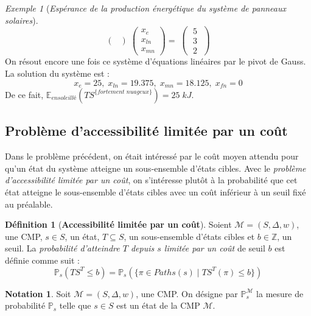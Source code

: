 \documentclass[12pt,a4paper]{report}
\theoremstyle{definition}%
\newtheorem{definition}{Définition}[chapter]
\newtheorem*{notation}{Notation}
\theoremstyle{remark}
\newtheorem{example}{Exemple}[chapter]
\newcommand{\pr}{\mathbb{P}}
\begin{document}
\begin{example}[\textit{Espérance de la production énergétique du système de panneaux solaires}]
\[\begin{pmatrix}
\end{pmatrix}
\;
\begin{pmatrix}
x_{e} \\[0.3em] x _{ln} \\[0.3em] x_{mn}
\end{pmatrix}
= \;
\begin{pmatrix}
\;5 \; \\[0.3em] \; 3 \; \\[0.3em] \; 2 \;
\end{pmatrix}
\]
On résout encore une fois ce système d'équations linéaires par le pivot de Gauss. La solution du système est :
\[ x_e = 25, \; x_{ln} = 19.375, \; x_{mn} = 18.125, \; x_{fn} = 0  \]
De ce fait, $\mathbb{E}_{\textit{ensoleillé}} (TS^{\{\textit{fortement nuageux}\}}) = 25\; kJ$.
\end{example}

\subsection{Problème d'accessibilité limitée par un coût}
Dans le problème précédent, on était intéressé par le coût moyen attendu pour qu'un état du système atteigne un sous-ensemble d'états cibles. Avec le \textit{problème d'accessibilité limitée par un coût}, on s'intéresse plutôt à la probabilité que cet état atteigne le sous-ensemble d'états cibles avec un coût inférieur à un seuil fixé au préalable.

\begin{definition}[\textbf{Accessibilité limitée par un coût}]\label{acc-lim}
	Soient $\mathcal{M} = (S, \Delta, w)$, une CMP, $s \in S$, un état, $T \subseteq S$, un sous-ensemble d'états cibles et $b \in \mathbb{Z}$, un seuil. La \textit{probabilité d'atteindre $T$ depuis $s$ limitée par un coût} de seuil $b$ est définie comme suit :
	\[\pr_s(TS^T \leq b) = \pr_s(\{\pi \in Paths(s) \; | \; TS^T(\pi) \leq b \}) \]
\end{definition}

\begin{notation}
Soit $\mathcal{M} = (S, \Delta, w)$, une CMP. On désigne par $\pr^\mathcal{M}_s$ la mesure de probabilité $\pr_s$ telle que $s \in S$ est un état de la CMP $\mathcal{M}$.
\end{notation}
\end{document}
